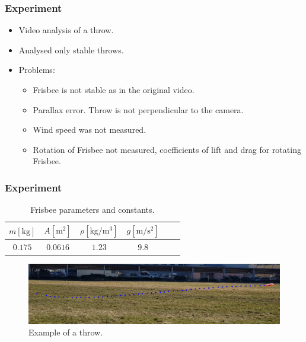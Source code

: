\documentclass{beamer}
\begin{document}

\begin{frame}

\frametitle{Experiment}

\begin{itemize}
\item Video analysis of a throw.
\item Analysed only stable throws.
\item Problems:

\begin{itemize}
\item Frisbee is not stable as in the original video.
\item Parallax error. Throw is not perpendicular to the camera.
\item Wind speed was not measured.
\item Rotation of Frisbee not measured, coefficients of lift and drag for rotating Frisbee.
\end{itemize}

\end{itemize}

\end{frame}


\begin{frame}

\frametitle{Experiment}

\begin{table}
\begin{tabular}{|c|c|c|c|c|c|}
\hline 
$m [\mathrm{kg}]$ & $A [\mathrm{m^2}]$ & $\rho [\mathrm{kg/m^3}]$ &  $g [\mathrm{m / s^2}]$ \\ 
\hline 
$0.175$ & $0.0616$ & $1.23$ & $9.8$ \\ 
\hline 
\end{tabular}
\caption{Frisbee parameters and constants.}
\end{table} 

\begin{figure}[H]
	\centering
	  \includegraphics[width=\textwidth]{primer_meta.png}
	  \caption{Example of a throw.}
\end{figure}

\end{frame}
\end{document}
